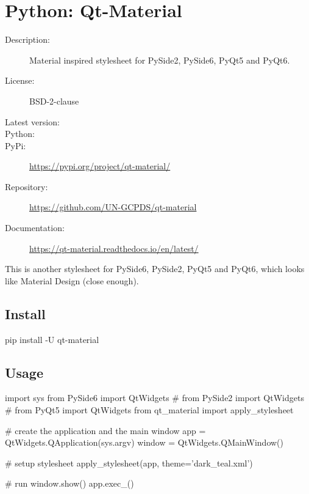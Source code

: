 \chapter{Python: Qt-Material}\label{appendix:qt-material}

\begin{description}
   \item[Description:]      Material inspired stylesheet for PySide2, PySide6, PyQt5 and PyQt6.
   \item[License:]          BSD-2-clause
   \item[Latest version:]   
   \item[Python:]           
   \item[PyPi:]             \url{https://pypi.org/project/qt-material/}
   \item[Repository:]       \url{https://github.com/UN-GCPDS/qt-material}
   \item[Documentation:]    \url{https://qt-material.readthedocs.io/en/latest/}
\end{description}
\hrulefill

This is another stylesheet for PySide6, PySide2, PyQt5 and PyQt6, which looks like Material Design (close enough).



\section{Install}
\begin{python}
pip install -U qt-material
\end{python}

\section{Usage}
\begin{python}
import sys
from PySide6 import QtWidgets
# from PySide2 import QtWidgets
# from PyQt5 import QtWidgets
from qt_material import apply_stylesheet

# create the application and the main window
app = QtWidgets.QApplication(sys.argv)
window = QtWidgets.QMainWindow()

# setup stylesheet
apply_stylesheet(app, theme='dark_teal.xml')

# run
window.show()
app.exec_()
\end{python}
\
